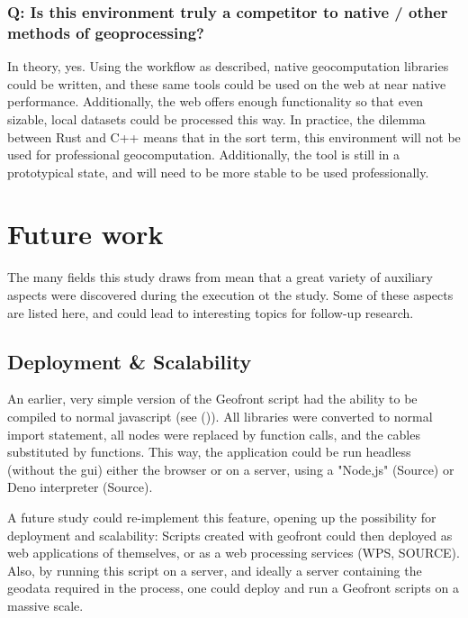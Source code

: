 \subsubsection*{Q: Is this environment truly a competitor to native / other methods of geoprocessing?}

In theory, yes.
Using the workflow as described, native geocomputation libraries could be written, and these same tools could be used on the web at near native performance. 
Additionally, the web offers enough functionality so that even sizable, local datasets could be processed this way.
In practice, the dilemma between Rust and C++ means that in the sort term, this environment will not be used for professional geocomputation.
Additionally, the tool is still in a prototypical state, and will need to be more stable to be used professionally. 


\section{Future work}
\label{sec:future-work}
The many fields this study draws from mean that a great variety of auxiliary aspects were discovered during the execution ot the study. 
Some of these aspects are listed here, and could lead to interesting topics for follow-up research. 

\subsection{Deployment \& Scalability}
An earlier, very simple version of the Geofront script had the ability to be compiled to normal javascript (see ()).  
All libraries were converted to normal import statement, all nodes were replaced by function calls, and the cables substituted by functions. 
This way, the application could be run headless (without the \ac{gui}) either the browser or on a server, using a "Node,js" (Source) or Deno interpreter (Source).

A future study could re-implement this feature, opening up the possibility for deployment and scalability: 
Scripts created with geofront could then deployed as web applications of themselves, or as a web processing services (WPS, SOURCE).
Also, by running this script on a server, and ideally a server containing the geodata required in the process, one could deploy and run a Geofront scripts on a massive scale. 


